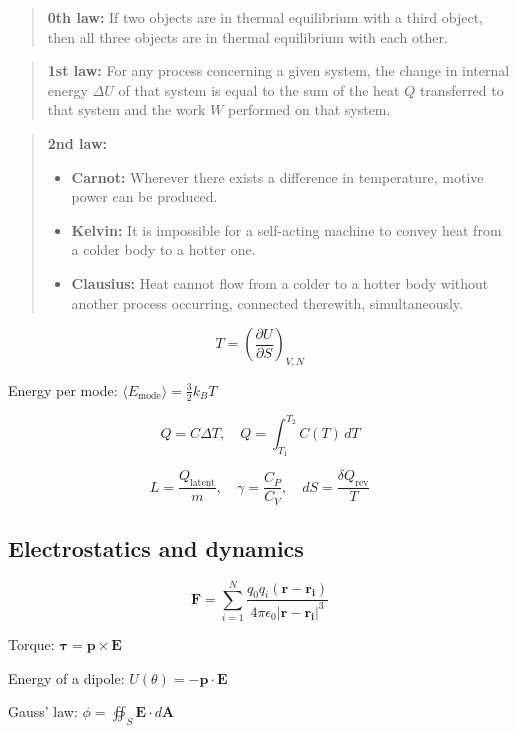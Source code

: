 \documentclass[12pt,a4paper]{article}
\begin{document}
\begin{quote}
\textbf{0th law:} 
If two objects are in thermal equilibrium with a third object, then all three objects are in thermal equilibrium with each other.
\end{quote}
\begin{quote}
\textbf{1st law:} 
For any process concerning a given system, the change in internal energy \(\Delta U\) of that system is equal to the sum of the heat \( Q \) transferred to that system and the work \( W \) performed on that system.
\end{quote}

\begin{quote}
\textbf{2nd law:} 
\begin{itemize}
	\item \textbf{Carnot:} Wherever there exists a difference in temperature, motive power can be produced.
	\item \textbf{Kelvin:} It is impossible for a self-acting machine to convey heat from a colder body to a hotter one.
	\item \textbf{Clausius:} Heat cannot flow from a colder to a hotter body without another process occurring, connected therewith, simultaneously.
\end{itemize}
\end{quote}
\[
T = \left( \frac{\partial U}{\partial S} \right)_{V, N}
\]

Energy per mode: \( \langle E_\text{mode} \rangle = \frac{3}{2} k_B T \)

\[
Q = C \Delta T, \quad Q = \int_{T_1}^{T_2} C(T) \, dT
\]

\[
L = \frac{Q_\text{latent}}{m}, \quad \gamma = \frac{C_P}{C_V}, \quad dS = \frac{\delta Q_\text{rev}}{T}
\]

	\subsection*{Electrostatics and dynamics}
	\setlength{\parskip}{.8em} %
	
	\[
	\mathbf{F} = \sum_{i=1}^{N} \frac{q_0 q_i (\mathbf{r}-\mathbf{r_i})}{4\pi \epsilon_0 |\mathbf{r}-\mathbf{r_i}|^3}
	\]
	
	Torque: \( \mathbf{\tau} = \mathbf{p} \times \mathbf{E} \)
	
	Energy of a dipole: \( U(\theta) = -\mathbf{p} \cdot \mathbf{E} \)
	
	Gauss' law: \( \phi = \oiint_{S} \mathbf{E} \cdot d\mathbf{A} \)
	
\end{document}
